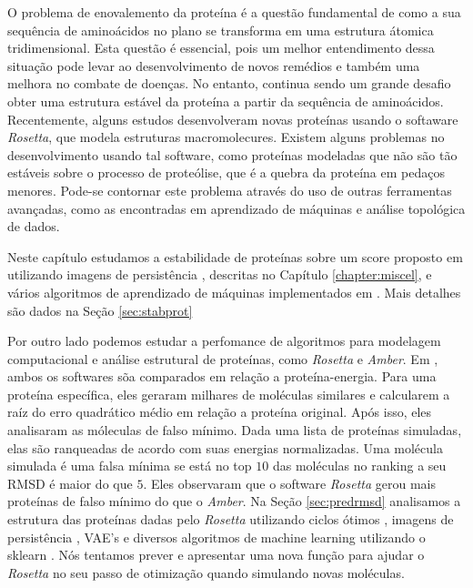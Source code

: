 O problema de enovalemento da proteína é a questão fundamental de como a sua sequência de aminoácidos
no plano se transforma em uma estrutura átomica tridimensional. Esta questão é essencial, pois
um melhor entendimento dessa situação pode levar ao desenvolvimento de novos remédios e também
uma melhora no combate de doenças. No entanto, continua sendo um grande desafio obter
uma estrutura estável da proteína a partir da sequência de aminoácidos.
Recentemente, alguns estudos \cite{Rocklin2017} desenvolveram novas proteínas usando o softaware
\textit{Rosetta}, que modela estruturas macromolecures. Existem alguns problemas no
desenvolvimento usando tal software, como proteínas modeladas que não são tão
estáveis sobre o processo de proteólise, que é a quebra da proteína em pedaços
menores. Pode-se contornar este problema através do uso de outras ferramentas avançadas, como
as encontradas em aprendizado de máquinas e análise topológica de dados.

Neste capítulo estudamos a estabilidade de proteínas sobre um score proposto
em \cite{Rocklin2017} utilizando imagens de persistência \cite{Adams2017}, descritas
no Capítulo \ref{chapter:miscel}, e vários algoritmos de aprendizado de máquinas
implementados em \cite{scikit-learn}. Mais detalhes são dados na Seção \ref{sec:stabprot}


Por outro lado podemos estudar a perfomance de algoritmos para modelagem computacional e
análise estrutural de proteínas, como \textit{Rosetta} e \textit{Amber}.
Em \cite{Rubenstein2018}, ambos os softwares sõa comparados em relação a proteína-energia.
Para uma proteína específica, eles geraram milhares de moléculas similares e calcularem
a raíz do erro quadrático médio em relação a proteína original.
Após isso, eles analisaram as móleculas de falso mínimo. Dada uma lista de proteínas
simuladas, elas são ranqueadas de acordo com suas energias normalizadas. Uma molécula
simulada é uma falsa mínima se está no top $10$ das moléculas no ranking a seu
RMSD é maior do que $5$. Eles observaram que o software \textit{Rosetta} gerou mais
proteínas de falso mínimo do que o \textit{Amber}. Na Seção \ref{sec:predrmsd}
analisamos a estrutura das proteínas dadas pelo \textit{Rosetta} utilizando ciclos ótimos
\cite{Escolar2015}, imagens de persistência \cite{Adams2017}, VAE's \cite{kingma2013} e
diversos algoritmos de machine learning utilizando o sklearn \cite{scikit-learn}. Nós
tentamos prever e apresentar uma nova função para ajudar o \textit{Rosetta} no seu
passo de otimização quando simulando novas moléculas.

